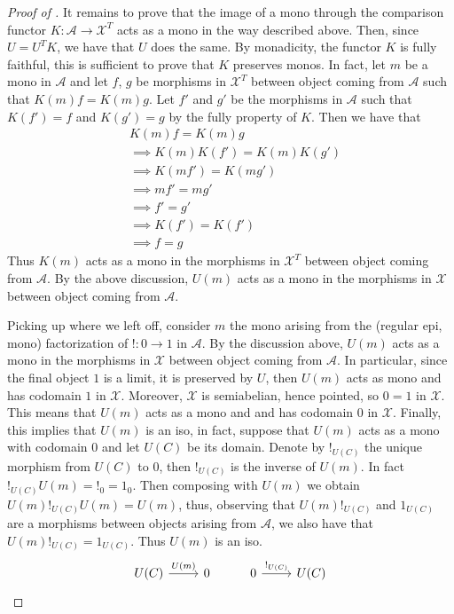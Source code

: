 \begin{subbox}{}
\begin{proof}[\textit{Proof of }]
    It remains to prove that the image of a mono through the comparison functor $K : \mathcal{A} \to \mathcal{X}^T$ acts as a mono in the way described above. Then, since $U=U^TK$, we have that $U$ does the same. By monadicity, the functor $K$ is fully faithful, this is sufficient to prove that $K$ preserves monos. In fact, let $m$ be a mono in $\mathcal{A}$ and let $f$, $g$ be morphisms in $\mathcal{X}^T$ between object coming from $\mathcal{A}$ such that $K(m)f = K(m)g$. Let $f'$ and $g'$ be the morphisms in $\mathcal{A}$ such that $K(f') = f$ and $K(g') = g$ by the fully property of $K$. Then we have that
    \begin{align*}
    &K(m)f = K(m)g\\[1.5ex]
    &\implies K(m) K(f') = K(m) K(g')\\[1.5ex]
    &\implies K(mf') = K(mg')\\[1.5ex]
    &\implies mf' = mg'\\[1.5ex]
    &\implies f' = g'\\[1.5ex]
    &\implies K(f') = K(f')\\[1.5ex]
    &\implies f = g
    \end{align*}
    Thus $K(m)$ acts as a mono in the morphisms in $\mathcal{X}^T$ between object coming from $\mathcal{A}$. By the above discussion, $U(m)$ acts as a mono in the morphisms in $\mathcal{X}$ between object coming from $\mathcal{A}$.

    Picking up where we left off, consider $m$ the mono arising from the (regular epi, mono) factorization of $!:0 \to 1$ in $\mathcal{A}$. By the discussion above, $U(m)$ acts as a mono in the morphisms in $\mathcal{X}$ between object coming from $\mathcal{A}$. In particular, since the final object $1$ is a limit, it is preserved by $U$, then $U(m)$ acts as mono and has codomain $1$ in $\mathcal{X}$. Moreover, $\mathcal{X}$ is semiabelian, hence pointed, so $0=1$ in $\mathcal{X}$. This means that $U(m)$ acts as a mono and and has codomain $0$ in $\mathcal{X}$. Finally, this implies that $U(m)$ is an iso, in fact, suppose that $U(m)$ acts as a mono with codomain $0$ and let $U(C)$ be its domain. Denote by $!_{U(C)}$ the unique morphism from $U(C)$ to $0$, then $!_{U(C)}$ is the inverse of $U(m)$. In fact $!_{U(C)}U(m)=!_0=1_0$. Then composing with $U(m)$ we obtain $U(m)!_{U(C)}U(m)=U(m)$, thus, observing that $U(m)!_{U(C)}$ and $1_{U(C)}$ are a morphisms between objects arising from $\mathcal{A}$, we also have that $U(m)!_{U(C)}=1_{U(C)}$. Thus $U(m)$ is an iso.
    \[
\begin{tikzcd}
U(C) \arrow[r, "U(m)"] & 0 & 0 \arrow[r, "!_{U(C)}"] & U(C)
\end{tikzcd}
    \]
    

\end{proof}
\end{subbox}
